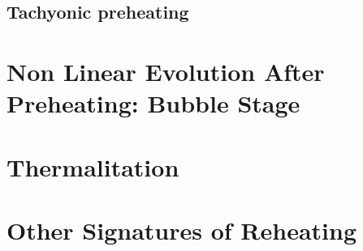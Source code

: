 \documentclass[11pt,a4paper,twoside]{book}
\begin{document}
\section{Tachyonic preheating}


\chapter{Non Linear Evolution After Preheating: Bubble Stage}




\chapter{Thermalitation}


\chapter{Other Signatures of Reheating}
\end{document}
